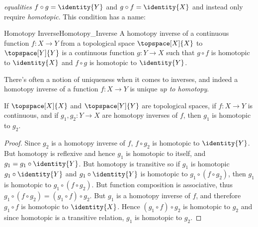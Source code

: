\documentclass{book}                                                           %
\begin{document}
                \textit{equalities} $f\circ{g}=\identity{Y}$ and
                $g\circ{f}=\identity{X}$ and instead only require
                \textit{homotopic}. This condition has a name:
                \begin{fdefinition}{Homotopy Inverse}{Homotopy_Inverse}
                    A homotopy inverse of a continuous function
                    $f:X\rightarrow{Y}$ from a topological space
                    $\topspace[X]{X}$ to $\topspace[Y]{Y}$ is a continuous
                    function $g:Y\rightarrow{X}$ such that $g\circ{f}$ is
                    homotopic to $\identity{X}$ and $f\circ{g}$ is homotopic to
                    $\identity{Y}$.
                \end{fdefinition}
                There's often a notion of uniqueness when it comes to inverses,
                and indeed a homotopy inverse of a function $f:X\rightarrow{Y}$
                is unique \textit{up to homotopy}.
                \begin{theorem}
                    If $\topspace[X]{X}$ and $\topspace[Y]{Y}$ are topological
                    spaces, if $f:X\rightarrow{Y}$ is continuous, and if
                    $g_{1},g_{2}:Y\rightarrow{X}$ are homotopy inverses
                    of $f$, then $g_{1}$ is homotopic to ${g}_{2}$.
                \end{theorem}
                \begin{proof}
                    Since $g_{2}$ is a homotopy inverse of $f$,
                    $f\circ{g}_{2}$ is homotopic to $\identity{Y}$. But homotopy
                    is reflexive and hence $g_{1}$ is homotopic to itself, and
                    $g_{1}=g_{1}\circ\identity{Y}$. But homotopy is transitive
                    so if $g_{1}$ is homotopic $g_{1}\circ\identity{Y}$ and
                    $g_{1}\circ\identity{Y}$ is homotopic to
                    $g_{1}\circ(f\circ{g}_{2})$, then $g_{1}$ is homotopic to
                    $g_{1}\circ(f\circ{g}_{2})$. But function composition is
                    associative, thus
                    $g_{1}\circ(f\circ{g}_{2})=(g_{1}\circ{f})\circ{g}_{2}$.
                    But $g_{1}$ is a homotopy inverse of $f$, and therefore
                    $g_{1}\circ{f}$ is homotopic to $\identity{X}$. Hence
                    $(g_{1}\circ{f})\circ{g}_{2}$ is homotopic to ${g}_{2}$ and
                    since homotopic is a transitive relation, $g_{1}$ is
                    homotopic to ${g}_{2}$.
                \end{proof}
\end{document}

